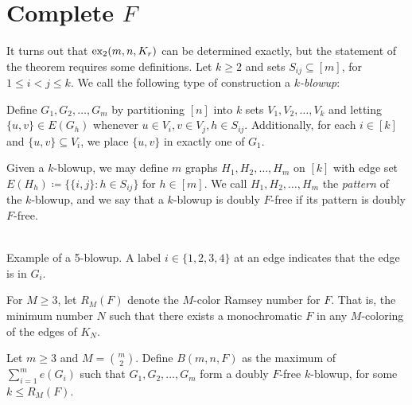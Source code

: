 \documentclass[12pt]{report}
\newcommand*{\dex}{\textnormal{ex}_2}
\begin{document}
\section{Complete $F$}

It turns out that $\dex(m, n, K_r)$ can be determined exactly, but the statement of the theorem requires some definitions. Let $k \geq 2$ and sets $S_{ij} \subseteq [m]$, for $1 \leq i < j \leq k$. We call the following type of construction a \textit{$k$-blowup}: 

Define $G_1, G_2, \ldots, G_m$ by partitioning $[n]$ into $k$ sets $V_1, V_2, \ldots, V_k$ and letting $\{u, v\} \in E(G_h)$ whenever $u \in V_i, v \in V_j, h \in S_{ij}$. Additionally, for each $i \in [k]$ and $\{u, v\} \subseteq V_i$, we place $\{u, v\}$ in exactly one of $G_1$. 

Given a $k$-blowup, we may define $m$ graphs $H_1, H_2, \ldots, H_m$ on $[k]$ with edge set $E(H_h) \coloneq \{\{i, j\} : h \in S_{ij}\}$ for $h \in [m]$. We call $H_1, H_2, \ldots, H_m$ the \textit{pattern} of the $k$-blowup, and we say that a $k$-blowup is doubly $F$-free if its pattern is doubly $F$-free. 

\begin{center}
  \\
  \small{Example of a 5-blowup. A label $i \in \{1, 2, 3, 4\}$ at an edge indicates that the edge is in $G_i$.}
\end{center}

For $M \geq 3$, let $R_M(F)$ denote the $M$-color Ramsey number for $F$. That is, the minimum number $N$ such that there exists a monochromatic $F$ in any $M$-coloring of the edges of $K_N$.

Let $m \geq 3$ and $M = \binom{m}{2}$. Define $B(m, n, F)$ as the maximum of $\sum_{i = 1}^m e(G_i)$ such that $G_1, G_2, \ldots, G_m$ form a doubly $F$-free $k$-blowup, for some $k \leq R_M(F)$.
\end{document}
